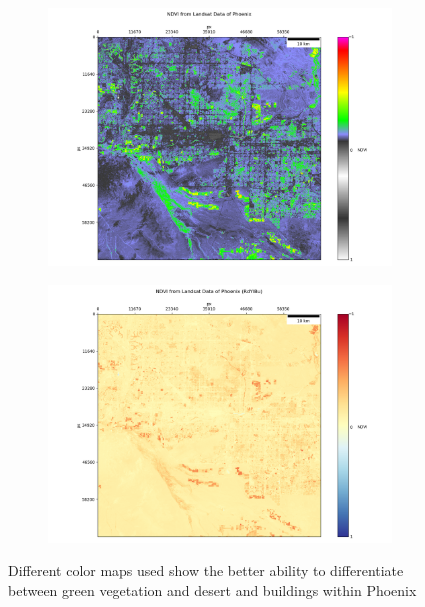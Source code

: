 \begin{figure}[htbp]
 \centering
    \begin{subfigure}{0.70\textwidth}
    \includegraphics[width=\textwidth]{img/NDVI from Landsat Data of Phoenix.png} 
    \end{subfigure}
    \begin{subfigure}{0.70\textwidth}
    \includegraphics[width=\textwidth]{img/NDVI from Landsat Data of Phoenix (RdYlBu).png} 
    \end{subfigure}
    \caption{Different color maps used show the better ability to differentiate between green vegetation and desert and buildings within Phoenix\label{fig:ndvicomp}}
\end{figure}
